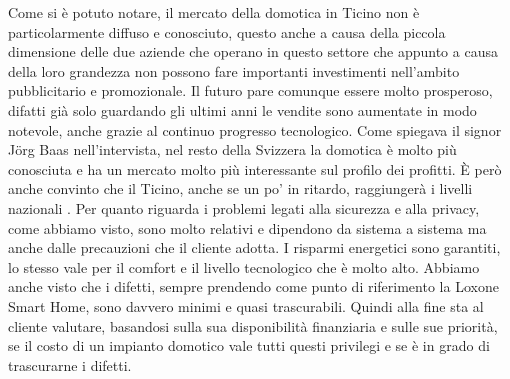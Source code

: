 Come si è potuto notare, il mercato della domotica in Ticino non è particolarmente diffuso e conosciuto, questo anche a causa della piccola dimensione delle due aziende che operano in questo settore che appunto a causa della loro grandezza non possono fare importanti investimenti nell’ambito pubblicitario e promozionale. Il futuro pare comunque essere molto prosperoso, difatti già solo guardando gli ultimi anni le vendite sono aumentate in modo notevole, anche grazie al continuo progresso tecnologico. Come spiegava il signor Jörg Baas nell’intervista, nel resto della Svizzera la domotica è molto più conosciuta e ha un mercato molto più interessante sul profilo dei profitti. È però anche convinto che il Ticino, anche se un po’ in ritardo, raggiungerà i livelli nazionali . Per quanto riguarda i problemi legati alla sicurezza e alla privacy, come abbiamo visto, sono molto relativi e dipendono da sistema a sistema ma anche dalle precauzioni che il cliente adotta. I risparmi energetici sono garantiti, lo stesso vale per il comfort e il livello tecnologico che è molto alto. Abbiamo anche visto che i difetti, sempre prendendo come punto di riferimento la Loxone Smart Home, sono davvero minimi e quasi trascurabili. Quindi alla fine sta al cliente valutare, basandosi sulla sua disponibilità finanziaria e sulle sue priorità, se il costo di un impianto domotico vale tutti questi privilegi e se è in grado di trascurarne i difetti.


